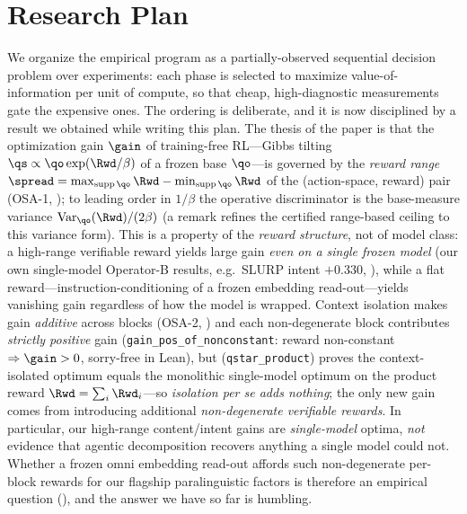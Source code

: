 \section{Research Plan}
\label{sec:plan}

We organize the empirical program as a partially-observed sequential decision problem over experiments: each phase is selected to maximize value-of-information per unit of compute, so that cheap, high-diagnostic measurements gate the expensive ones. The ordering is deliberate, and it is now disciplined by a result we obtained while writing this plan. The thesis of the paper is that the optimization gain $\gain$ of training-free RL---Gibbs tilting $\qs \propto \qo\exp(\Rwd/\beta)$ of a frozen base $\qo$---is governed by the \emph{reward range} $\spread = \max_{\operatorname{supp}\qo}\Rwd - \min_{\operatorname{supp}\qo}\Rwd$ of the (action-space, reward) pair (OSA-1, ); to leading order in $1/\beta$ the operative discriminator is the base-measure variance $\operatorname{Var}_{\qo}(\Rwd)/(2\beta)$ (a remark refines the certified range-based ceiling to this variance form). This is a property of the \emph{reward structure}, not of model class: a high-range verifiable reward yields large gain \emph{even on a single frozen model} (our own single-model Operator-B results, e.g.\ SLURP intent $+0.330$, ), while a flat reward---instruction-conditioning of a frozen embedding read-out---yields vanishing gain regardless of how the model is wrapped. Context isolation makes gain \emph{additive} across blocks (OSA-2, ) and each non-degenerate block contributes \emph{strictly positive} gain (\texttt{gain\_pos\_of\_nonconstant}: reward non-constant $\Rightarrow \gain>0$, sorry-free in Lean), but  (\texttt{qstar\_product}) proves the context-isolated optimum equals the monolithic single-model optimum on the product reward $\Rwd=\sum_i\Rwd_i$---so \emph{isolation per se adds nothing}; the only new gain comes from introducing additional \emph{non-degenerate verifiable rewards}. In particular, our high-range content/intent gains are \emph{single-model} optima, \emph{not} evidence that agentic decomposition recovers anything a single model could not. Whether a frozen omni embedding read-out affords such non-degenerate per-block rewards for our flagship paralinguistic factors is therefore an empirical question (), and the answer we have so far is humbling.

